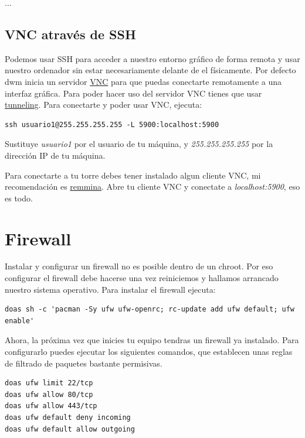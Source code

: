 \documentclass[12pt]{article}
\begin{document}
...

\subsection{VNC através de SSH}

Podemos usar SSH para acceder a nuestro entorno gráfico de forma remota y usar nuestro ordenador sin estar necesariamente delante de el físicamente. Por defecto dwm inicia un servidor \href{https://en.wikipedia.org/wiki/Virtual_Network_Computing}{VNC} para que puedas conectarte remotamente a una interfaz gráfica. Para poder hacer uso del servidor VNC tienes que usar \href{https://en.wikipedia.org/wiki/Tunneling_protocol}{tunneling}. Para conectarte y poder usar VNC, ejecuta:

\begin{verbatim}
ssh usuario1@255.255.255.255 -L 5900:localhost:5900
\end{verbatim}

Sustituye \emph{usuario1} por el usuario de tu máquina, y \emph{255.255.255.255} por la dirección IP de tu máquina.

Para conectarte a tu torre debes tener instalado algun cliente VNC, mi recomendación es \href{https://github.com/FreeRDP/Remmina}{remmina}. Abre tu cliente VNC y conectate a \emph{localhost:5900}, eso es todo.

\section{Firewall}

Instalar y configurar un firewall no es posible dentro de un chroot. Por eso configurar el firewall debe hacerse una vez reiniciemos y hallamos arrancado nuestro sistema operativo. Para instalar el firewall ejecuta:

\begin{verbatim}
doas sh -c 'pacman -Sy ufw ufw-openrc; rc-update add ufw default; ufw enable'
\end{verbatim}

Ahora, la próxima vez que inicies tu equipo tendras un firewall ya instalado. Para configurarlo puedes ejecutar los siguientes comandos, que establecen unas reglas de filtrado de paquetes bastante permisivas.

\begin{verbatim}
doas ufw limit 22/tcp
doas ufw allow 80/tcp
doas ufw allow 443/tcp
doas ufw default deny incoming
doas ufw default allow outgoing
\end{verbatim}
\end{document}

